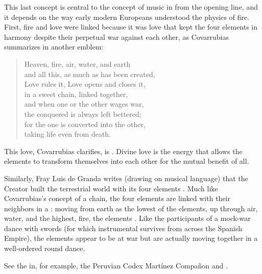 This last concept is central to the concept of music in  from the opening line, and it depends on the way early
modern Europeans understood the physics of fire.
First, fire and love were linked because it was love that kept the four
elements in harmony despite their perpetual war against each other, as
Covarrubias summarizes in another emblem:
\begin{quoting}
    \begin{verse}
        Heaven, fire, air, water, and earth\\
        and all this, as much as has been created,\\
        Love rules it, Love opens and closes it,\\
        in a sweet chain, linked together,\\
        and when one or the other wages war,\\
        the conquered is always left bettered;\\
        for the one is converted into the other,\\
        taking life even from death.%
            \Autocite[ I, ]
            {Covarrubias:Emblemas}
    \end{verse}
\end{quoting}
This love, Covarrubias clarifies, is .
Divine love is the energy that allows the elements to transform themselves into
each other for the mutual benefit of all.

Similarly, Fray Luis de Granda writes (drawing on musical language) that the
Creator built the terrestrial world with its four elements .%
    \Autocite[204]{LuisdeGranada:Simbolo}
Much like Covarrubias's concept of a chain, the four elements are linked with
their neighbors in a : moving from
earth as the lowest of the elements, up through air, water, and the highest,
fire, the elements .
    \Autocite[204]{LuisdeGranada:Simbolo}
Like the participants of a mock-war dance with swords (for which instrumental
survives from across the Spanish Empire), the elements appear to be at war but
are actually moving together in a well-ordered round dance.%
\begin{Footnote}
    See the  in, for example, the Peruvian Codex
    Martínez Compañon and \autocite{MartinyColl:HuertoAmeno}.
\end{Footnote}


